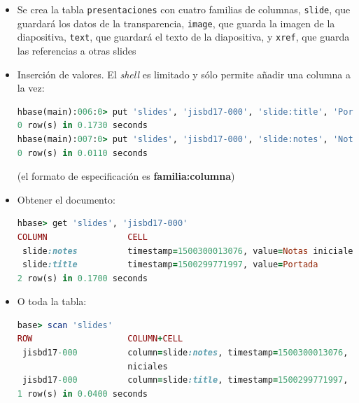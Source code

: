 \documentclass[14pt]{beamer}
\begin{document}
\begin{frame}
\begin{itemize}
\begin{frame}
\begin{itemize}
\item Se crea la tabla {\tt presentaciones} con cuatro familias de columnas,
  {\tt slide}, que guardará los datos de la transparencia, {\tt image}, que
  guarda la imagen de la diapositiva, {\tt text}, que guardará el texto
  de la diapositiva, y {\tt xref}, que guarda las referencias a otras slides

\framebreak

\item Inserción de valores. El {\em shell\/} es limitado y sólo permite
  añadir una columna a la vez:
\begin{lstlisting}[language=ruby,basicstyle=\scriptsize\tt]
hbase(main):006:0> put 'slides', 'jisbd17-000', 'slide:title', 'Portada'
0 row(s) in 0.1730 seconds
hbase(main):007:0> put 'slides', 'jisbd17-000', 'slide:notes', 'Notas iniciales'
0 row(s) in 0.0110 seconds
\end{lstlisting}

  (el formato de especificación es {\bf familia:columna})

\framebreak

\item Obtener el documento:

\begin{lstlisting}[language=ruby,basicstyle=\tiny\tt]
hbase> get 'slides', 'jisbd17-000'
COLUMN                CELL
 slide:notes          timestamp=1500300013076, value=Notas iniciales
 slide:title          timestamp=1500299771997, value=Portada
2 row(s) in 0.1700 seconds
\end{lstlisting}

\item O toda la tabla:
\begin{lstlisting}[language=ruby,basicstyle=\tiny\tt]
base> scan 'slides'
ROW                   COLUMN+CELL
 jisbd17-000          column=slide:notes, timestamp=1500300013076, value=Notas i
                      niciales
 jisbd17-000          column=slide:title, timestamp=1500299771997, value=Portada
1 row(s) in 0.0400 seconds
\end{lstlisting}
\end{itemize}

\end{frame}


\end{itemize}
\end{frame}
\end{document}
